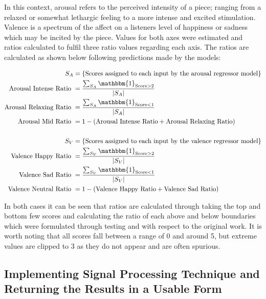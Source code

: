 \documentclass[12pt,]{article}
\begin{document}
In this context, arousal refers to the perceived intensity of a piece;
ranging from a relaxed or somewhat lethargic feeling to a more intense
and excited stimulation. Valence is a spectrum of the affect on a
listeners level of happiness or sadness which may be incited by the
piece. Values for both axes were estimated and ratios calculated to
fulfil three ratio values regarding each axis. The ratios are calculated
as shown below following predictions made by the models:

\[\begin{aligned}
S_A &= \{\text{Scores assigned to each input by the arousal regressor model}\} \\
\text{Arousal Intense Ratio } &= \frac{\sum_{S_A} \mathbbm{1}_{\text{Score}> 2}}{|S_A|} \\
\text{Arousal Relaxing Ratio } &= \frac{\sum_{S_A} \mathbbm{1}_{\text{Score}< 1}}{|S_A|} \\
\text{Arousal Mid Ratio } &= 1 - (\text{Arousal Intense Ratio} + \text{Arousal Relaxing Ratio}) \\ \\
S_V &= \{\text{Scores assigned to each input by the valence regressor model}\} \\
\text{Valence Happy Ratio } &= \frac{\sum_{S_V} \mathbbm{1}_{\text{Score}> 2}}{|S_V|} \\
\text{Valence Sad Ratio } &= \frac{\sum_{S_V} \mathbbm{1}_{\text{Score}< 1}}{|S_V|} \\
\text{Valence Neutral Ratio } &= 1 - (\text{Valence Happy Ratio} + \text{Valence Sad Ratio}) \\
\end{aligned}\]

In both cases it can be seen that ratios are calculated through taking
the top and bottom few scores and calculating the ratio of each above
and below boundaries which were formulated through testing and with
respect to the original work. It is worth noting that all scores fall
between a range of 0 and around 5, but extreme values are clipped to 3
as they do not appear and are often spurious.

\hypertarget{implementing-signal-processing-technique-and-returning-the-results-in-a-usable-form}{%
\subsection{Implementing Signal Processing Technique and Returning the
Results in a Usable
Form}\label{implementing-signal-processing-technique-and-returning-the-results-in-a-usable-form}}
\end{document}
